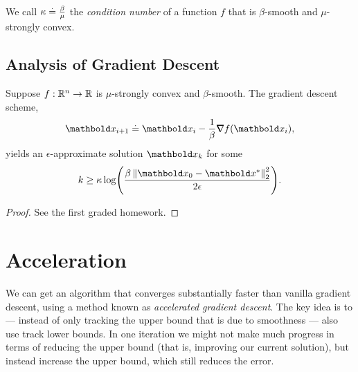 \begin{defn} We call $\kappa \overset{.}{=} \frac{\beta}{\mu}$ the \emph{condition number} of a function $f$ that is $\beta$-smooth and $\mu$-strongly convex.
\end{defn}

\subsection{Analysis of Gradient Descent}

\begin{thm} Suppose $f: \mathbb{R}^n \to \mathbb{R}$ is $\mu$-strongly convex and $\beta$-smooth. The gradient descent scheme, \begin{align}
    \vx_{i+1} \defeq \vx_i - \frac{1}{\beta}\grad f(\vx_i),
\end{align} yields an $\epsilon$-approximate solution $\vx_k$ for some \begin{align*}
    k \geq \kappa\log\parentheses*{\frac{\beta\norm{\vx_0 - \s{\vx}}_2^2}{2\epsilon}}.
\end{align*}
\end{thm}
\begin{proof}
See the first graded homework.
\end{proof}

\section{Acceleration}

We can get an algorithm that converges substantially faster than vanilla gradient descent, using a method known as \emph{accelerated gradient descent}. The key idea is to --- instead of only tracking the upper bound that is due to smoothness --- also use track lower bounds. In one iteration we might not make much progress in terms of reducing the upper bound (that is, improving our current solution), but instead increase the upper bound, which still reduces the error.


